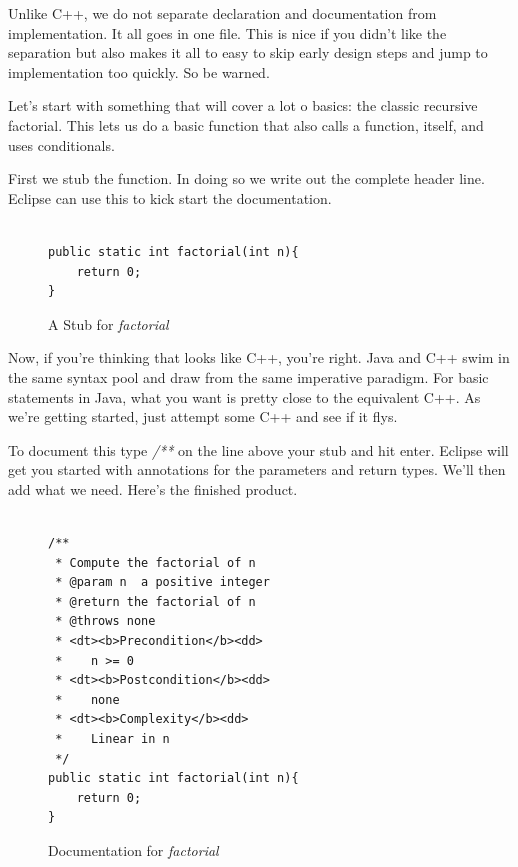 \documentclass[]{tufte-handout}
\begin{document}
Unlike C++, we do not separate declaration and documentation from implementation. It all goes in one file. This is nice if you didn't like the separation but also makes it all to easy to skip early design steps and jump to implementation too quickly. So be warned. 


Let's start with something that will cover a lot o basics: the classic recursive factorial. This lets us do a basic function that also calls a function, itself, and uses conditionals. 

First we stub the function. In doing so we write out the complete header line. Eclipse can use this to kick start the documentation.

\begin{figure}
\begin{lstlisting}

public static int factorial(int n){
	return 0;
}

\end{lstlisting}
\caption{A Stub for \textit{factorial}}
\label{fig:funcStub}
\end{figure}

Now, if you're thinking that looks like C++, you're right. Java and C++ swim in the same syntax pool and draw from the same imperative paradigm. For basic statements in Java, what you want is pretty close to the equivalent C++. As we're getting started, just attempt some C++ and see if it flys. 

To document this type \textit{/**} on the line above your stub and hit enter. Eclipse will get you started with annotations for the parameters and return types. We'll then add what we need. Here's the finished product. 

\begin{figure}
\begin{lstlisting}

/**
 * Compute the factorial of n
 * @param n	 a positive integer
 * @return the factorial of n
 * @throws none
 * <dt><b>Precondition</b><dd>
 *    n >= 0
 * <dt><b>Postcondition</b><dd>
 *    none
 * <dt><b>Complexity</b><dd> 	 
 *    Linear in n
 */
public static int factorial(int n){
	return 0;
}

\end{lstlisting}
\caption{Documentation for \textit{factorial}}
\label{fig:factDoxed}
\end{figure}
\end{document}
